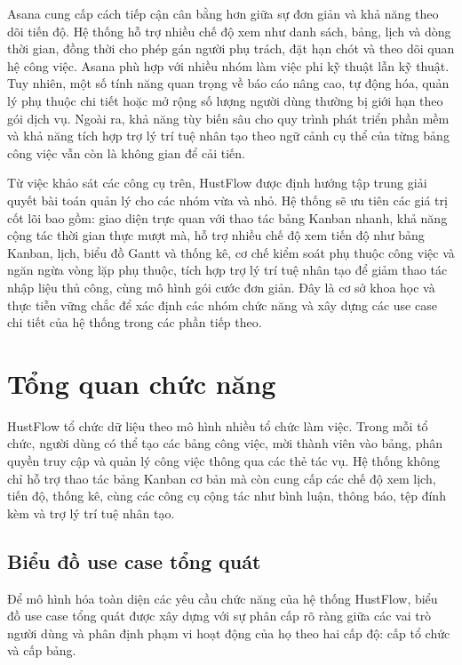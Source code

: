 \documentclass[../DoAn.tex]{subfiles}
\begin{document}
Asana cung cấp cách tiếp cận cân bằng hơn giữa sự đơn giản và khả năng theo dõi tiến độ. Hệ thống hỗ trợ nhiều chế độ xem như danh sách, bảng, lịch và dòng thời gian, đồng thời cho phép gán người phụ trách, đặt hạn chót và theo dõi quan hệ công việc. Asana phù hợp với nhiều nhóm làm việc phi kỹ thuật lẫn kỹ thuật. Tuy nhiên, một số tính năng quan trọng về báo cáo nâng cao, tự động hóa, quản lý phụ thuộc chi tiết hoặc mở rộng số lượng người dùng thường bị giới hạn theo gói dịch vụ. Ngoài ra, khả năng tùy biến sâu cho quy trình phát triển phần mềm và khả năng tích hợp trợ lý trí tuệ nhân tạo theo ngữ cảnh cụ thể của từng bảng công việc vẫn còn là không gian để cải tiến.

Từ việc khảo sát các công cụ trên, HustFlow được định hướng tập trung giải quyết bài toán quản lý cho các nhóm vừa và nhỏ. Hệ thống sẽ ưu tiên các giá trị cốt lõi bao gồm: giao diện trực quan với thao tác bảng Kanban nhanh, khả năng cộng tác thời gian thực mượt mà, hỗ trợ nhiều chế độ xem tiến độ như bảng Kanban, lịch, biểu đồ Gantt và thống kê, cơ chế kiểm soát phụ thuộc công việc và ngăn ngừa vòng lặp phụ thuộc, tích hợp trợ lý trí tuệ nhân tạo để giảm thao tác nhập liệu thủ công, cùng mô hình gói cước đơn giản. Đây là cơ sở khoa học và thực tiễn vững chắc để xác định các nhóm chức năng và xây dựng các use case chi tiết của hệ thống trong các phần tiếp theo.


\section{Tổng quan chức năng}
\label{section:2.2}

HustFlow tổ chức dữ liệu theo mô hình nhiều tổ chức làm việc. Trong mỗi tổ chức, người dùng có thể tạo các bảng công việc, mời thành viên vào bảng, phân quyền truy cập và quản lý công việc thông qua các thẻ tác vụ. Hệ thống không chỉ hỗ trợ thao tác bảng Kanban cơ bản mà còn cung cấp các chế độ xem lịch, tiến độ, thống kê, cùng các công cụ cộng tác như bình luận, thông báo, tệp đính kèm và trợ lý trí tuệ nhân tạo.

\subsection{Biểu đồ use case tổng quát}
\label{subsection:2.2.1}

Để mô hình hóa toàn diện các yêu cầu chức năng của hệ thống HustFlow, biểu đồ use case tổng quát được xây dựng với sự phân cấp rõ ràng giữa các vai trò người dùng và phân định phạm vi hoạt động của họ theo hai cấp độ: cấp tổ chức và cấp bảng.
\end{document}
